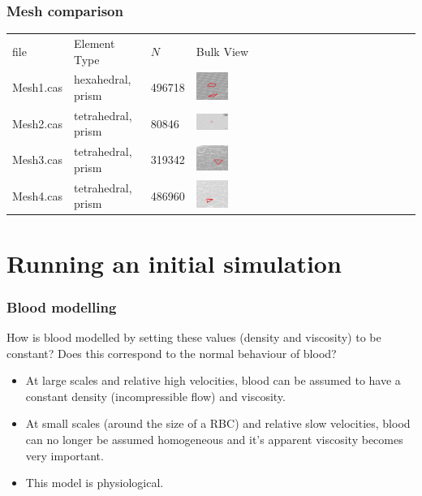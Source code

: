 \documentclass[11pt,t]{beamer}
\begin{document}
    \begin{frame}
        \frametitle{Mesh comparison}
        \begin{center}
            \begin{tabular}{m{} m{} m{} m{}}
                file & Element Type & $N$ & Bulk View\\
                Mesh1.cas & hexahedral, prism & 496718 & \includegraphics[width=0.15\textwidth]{Mesh1_element_bulk.png}\\
                Mesh2.cas & tetrahedral, prism & 80846 & \includegraphics[width=0.15\textwidth]{Mesh2_element_bulk.png}\\
                Mesh3.cas & tetrahedral, prism & 319342 & \includegraphics[width=0.15\textwidth]{Mesh3_element_bulk.png}\\
                Mesh4.cas & tetrahedral, prism & 486960 & \includegraphics[width=0.15\textwidth]{Mesh4_element_bulk.png}
            \end{tabular} 
        \end{center}
    \end{frame}

    \section{Running an initial simulation}

    \begin{frame}
        \frametitle{Blood modelling}
        How is blood modelled by setting these values (density and viscosity) to be constant? Does this correspond to the normal behaviour of blood?
        \begin{itemize}
            \item<2->[$\rightarrow$] At large scales and relative high velocities, blood can be assumed to have a constant density (incompressible flow) and viscosity.
            \item<3->[$\rightarrow$] At small scales (around the size of a RBC) and relative slow velocities, blood can no longer be assumed homogeneous and it's apparent viscosity becomes very important.
            \item<4->[$\Rightarrow$]  This model is physiological.
        \end{itemize}
    \end{frame}
\end{document}
